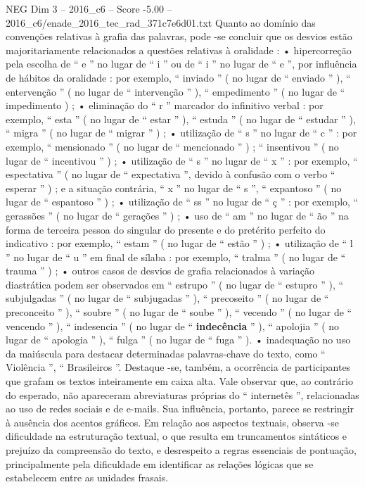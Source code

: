 \begin{textsample}{NEG Dim 3 – 2016\_c6 – Score -5.00 – 2016\_c6/enade\_2016\_tec\_rad\_371c7e6d01.txt}
Quanto ao domínio das convenções relativas à grafia das palavras, pode -se concluir que os desvios estão majoritariamente relacionados a questões relativas à oralidade : • hipercorreção pela escolha de “ e ” no lugar de “ i ” ou de “ i ” no lugar de “ e ”, por influência de hábitos da oralidade : por exemplo, “ inviado ” ( no lugar de “ enviado ” ), “ entervenção ” ( no lugar de “ intervenção ” ), “ empedimento ” ( no lugar de “ impedimento ) ; • eliminação do “ r ” marcador do infinitivo verbal : por exemplo, “ esta ” ( no lugar de “ estar ” ), “ estuda ” ( no lugar de “ estudar ” ), “ migra ” ( no lugar de “ migrar ” ) ; • utilização de “ s ” no lugar de “ c ” : por exemplo, “ mensionado ” ( no lugar de “ mencionado ” ) ; “ insentivou ” ( no lugar de “ incentivou ” ) ; • utilização de “ s ” no lugar de “ x ” : por exemplo, “ espectativa ” ( no lugar de “ expectativa ”, devido à confusão com o verbo “ esperar ” ) ; e a situação contrária, “ x ” no lugar de “ s ”, “ expantoso ” ( no lugar de “ espantoso ” ) ; • utilização de “ ss ” no lugar de “ ç ” : por exemplo, “ gerassões ” ( no lugar de “ gerações ” ) ; • uso de “ am ” no lugar de “ ão ” na forma de terceira pessoa do singular do presente e do pretérito perfeito do indicativo : por exemplo, “ estam ” ( no lugar de “ estão ” ) ; • utilização de “ l ” no lugar de “ u ” em final de sílaba : por exemplo, “ tralma ” ( no lugar de “ trauma ” ) ; • outros casos de desvios de grafia relacionados à variação diastrática podem ser observados em “ estrupo ” ( no lugar de “ estupro ” ), “ subjulgadas ” ( no lugar de “ subjugadas ” ), “ precoseito ” ( no lugar de “ preconceito ” ), “ soubre ” ( no lugar de “ soube ” ), “ vecendo ” ( no lugar de “ vencendo ” ), “ indesencia ” ( no lugar de “ \textbf{indecência} ” ), “ apolojia ” ( no lugar de “ apologia ” ), “ fulga ” ( no lugar de “ fuga ” ). • inadequação no uso da maiúscula para destacar determinadas palavras-chave do texto, como “ Violência ”, “ Brasileiros ”.
Destaque -se, também, a ocorrência de participantes que grafam os textos inteiramente em caixa alta.
Vale observar que, ao contrário do esperado, não apareceram abreviaturas próprias do “ internetês ”, relacionadas ao uso de redes sociais e de e-mails.
Sua influência, portanto, parece se restringir à ausência dos acentos gráficos.
Em relação aos aspectos textuais, observa -se dificuldade na estruturação textual, o que resulta em truncamentos sintáticos e prejuízo da compreensão do texto, e desrespeito a regras essenciais de pontuação, principalmente pela dificuldade em identificar as relações lógicas que se estabelecem entre as unidades frasais.

\end{textsample}

